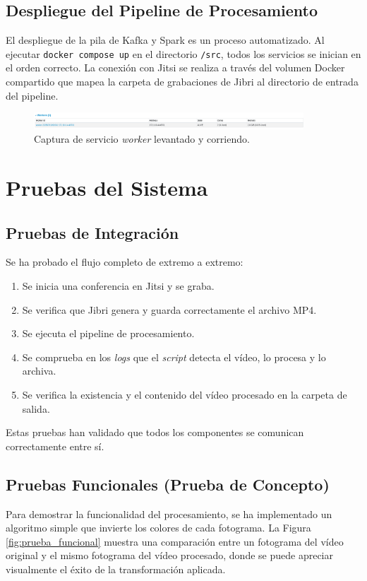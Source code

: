 \subsection{Despliegue del Pipeline de Procesamiento}
El despliegue de la pila de Kafka y Spark es un proceso automatizado. Al ejecutar \texttt{docker compose up} en el directorio \texttt{/src}, todos los servicios se inician en el orden correcto. La conexión con Jitsi se realiza a través del volumen Docker compartido que mapea la carpeta de grabaciones de Jibri al directorio de entrada del pipeline.

\begin{figure}[H]
    \centering
    \includegraphics[width=0.9\textwidth]{img/workerpy.png}
    \caption{Captura de servicio \textit{worker} levantado y corriendo.}
    \label{fig:worker_py}
\end{figure}

\section{Pruebas del Sistema}

\subsection{Pruebas de Integración}
Se ha probado el flujo completo de extremo a extremo:
\begin{enumerate}
    \item Se inicia una conferencia en Jitsi y se graba.
    \item Se verifica que Jibri genera y guarda correctamente el archivo MP4.
    \item Se ejecuta el pipeline de procesamiento.
    \item Se comprueba en los \textit{logs} que el \textit{script} detecta el vídeo, lo procesa y lo archiva.
    \item Se verifica la existencia y el contenido del vídeo procesado en la carpeta de salida.
\end{enumerate}
Estas pruebas han validado que todos los componentes se comunican correctamente entre sí.

\subsection{Pruebas Funcionales (Prueba de Concepto)}
Para demostrar la funcionalidad del procesamiento, se ha implementado un algoritmo simple que invierte los colores de cada fotograma. La Figura \ref{fig:prueba_funcional} muestra una comparación entre un fotograma del vídeo original y el mismo fotograma del vídeo procesado, donde se puede apreciar visualmente el éxito de la transformación aplicada.

